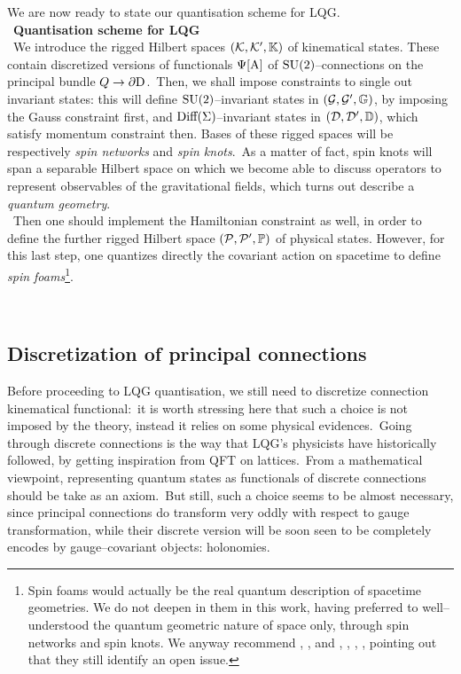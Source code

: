 {We are now ready to state our quantisation scheme for LQG.\\
\,\newline
\textbf{Quantisation scheme for LQG}\\
\,\newline
     We introduce the rigged Hilbert spaces $(\mathcal{K},\mathcal{K}',\mathbb{K})$ of kinematical states. These contain discretized versions of functionals $\Psi[\text{\normalfont A}]$ of $\text{\normalfont SU}(2)$--connections on the principal bundle $Q\to\partial\text{\normalfont D}$.\, Then, we shall impose constraints to single out invariant states: this will define $\text{\normalfont SU}(2)$--invariant states in $(\mathcal{G},\mathcal{G}',\mathbb{G})$, by imposing the Gauss constraint first, and $\text{\normalfont Diff}(\Sigma)$--invariant states in $(\mathcal{D},\mathcal{D}',\mathbb{D})$, which satisfy momentum constraint then. Bases of these rigged spaces will be respectively \emph{spin networks} and \emph{spin knots}.\, As a matter of fact, spin knots will span a separable Hilbert space on which we become able to discuss operators to represent observables of the gravitational fields, which turns out describe a \emph{quantum geometry}.}\\
     \,\newline
     Then one should implement the Hamiltonian constraint as well, in order to define the further rigged Hilbert space $(\mathcal{P},\mathcal{P}',\mathbb{P})$ of physical states. However, for this last step, one quantizes directly the covariant action on spacetime to define \emph{spin foams}\footnote{Spin foams would actually be the real quantum description of spacetime geometries. %
     We do not deepen in them in this work, having preferred to well--understood the quantum geometric nature of space only, through spin networks and spin knots. We anyway recommend \cite{rov1}, \cite{rov2}, and \cite{spinfoamsBaez}, \cite{spinfoamsOriti}, \cite{spinfoamsPerez1}, \cite{spinfoamsPerez2}, pointing out that they still identify an open issue.}.

\,\newline
\subsection{Discretization of principal connections}
 Before proceeding to LQG quantisation, we still need to discretize connection kinematical functional:\, it is worth stressing here that such a choice is not imposed by the theory, instead it relies on some physical evidences.\, Going through discrete connections is the way that LQG's physicists have historically followed, by getting inspiration from QFT on lattices.\, From a mathematical viewpoint, representing quantum states as functionals of discrete connections should be take as an axiom.\, But still, such a choice seems to be almost necessary, since principal connections do transform very oddly with respect to gauge transformation, while their discrete version will be soon seen to be completely encodes by gauge--covariant objects: holonomies.

